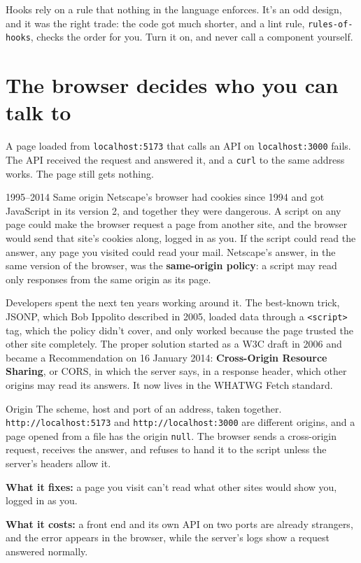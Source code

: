 Hooks rely on a rule that nothing in the language enforces. It's an odd design,
and it was the right trade: the code got much shorter, and a lint rule,
\texttt{rules-of-hooks}, checks the order for you. Turn it on, and never call a
component yourself.

\section{The browser decides who you can talk to}

A page loaded from \texttt{localhost:5173} that calls an API on
\texttt{localhost:3000} fails. The API received the request and answered it,
and a \texttt{curl} to the same address works. The page still gets nothing.

\begin{history}{1995--2014 \textperiodcentered{} Same origin}
Netscape's browser had cookies since 1994 and got JavaScript in its version 2,
and together they were dangerous. A script on any page could make the browser
request a page from another site, and the browser would send that site's
cookies along, logged in as you. If the script could read the answer, any page
you visited could read your mail. Netscape's answer, in the same version of the
browser, was the
\textbf{same-origin policy}: a script may read only responses from the same
origin as its page.

Developers spent the next ten years working around it. The best-known trick,
JSONP, which Bob Ippolito described in 2005, loaded data through a
\texttt{<script>} tag, which the policy didn't cover, and only worked because
the page trusted the other site completely. The proper solution started as a
W3C draft in 2006 and became a Recommendation on 16 January 2014:
\textbf{Cross-Origin Resource Sharing}, or CORS, in which the server says, in a
response header, which other origins may read its answers. It now lives in the
WHATWG Fetch standard.
\end{history}

\begin{concept}{Origin}
The scheme, host and port of an address, taken together.
\texttt{http://localhost:5173} and \texttt{http://localhost:3000} are different
origins, and a page opened from a file has the origin \texttt{null}. The
browser sends a cross-origin request, receives the answer, and refuses to hand
it to the script unless the server's headers allow it.

\textbf{What it fixes:} a page you visit can't read what other sites would
show you, logged in as you.

\textbf{What it costs:} a front end and its own API on two ports are already
strangers, and the error appears in the browser, while the server's logs show
a request answered normally.
\end{concept}

